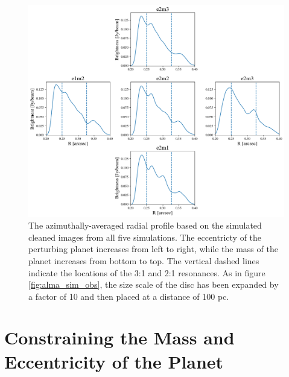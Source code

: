 \documentclass[fleqn,usenatbib]{mnras}
\begin{document}
\begin{figure}
    \includegraphics[width=\textwidth]{figures/alma_profiles.png}
    \caption{The azimuthally-averaged radial profile based on the simulated cleaned images from all five simulations. The eccentricty of the perturbing planet increases from left to right, while the mass of the planet increases from bottom to top. The vertical dashed lines indicate the locations of the 3:1 and 2:1 resonances. As in figure \ref{fig:alma_sim_obs}, the size scale of the disc has been expanded by a factor of 10 and then placed at a distance of 100 pc.\label{fig:alma_profiles}}
\end{figure}

\section{Constraining the Mass and Eccentricity of the Planet}\label{sec:constrain}
\end{document}

